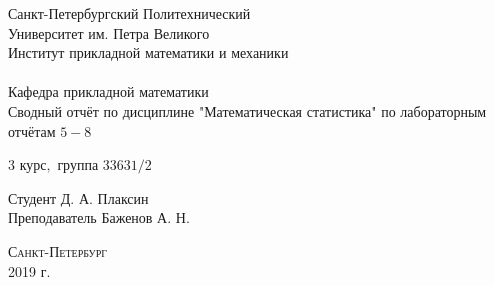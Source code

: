 \documentclass[a4]{article}
\begin{document}



\def\contentsname{\LARGE{Содержание}}
\thispagestyle{empty}
\begin{center} 
\vspace{2cm} 
{\Large \sc Санкт-Петербургский Политехнический}\\
\vspace{2mm}
{\Large \sc Университет} им. {\Large\sc Петра Великого}\\
\vspace{1cm}
{\large \sc Институт прикладной математики и механики\\ 
\vspace{0.5mm}
\textsc{}}\\ 
\vspace{0.5mm}
{\large\sc Кафедра прикладной математики}\\
\vspace{15mm}
{\huge \sc Сводный отчёт по дисциплине "Математическая статистика" по лабораторным отчётам $5-8$\\
\vspace{6mm}
 }
\vspace*{2mm}
\vspace{1cm}

{\sc $3$ курс$,$ группа $33631/2$}

\vspace{2cm} 
Студент \hfill Д. А. Плаксин\\
\vspace{1cm}
Преподаватель \hfill Баженов А. Н.\\
\vspace{20mm} 

\end{center} 
\begin{center}
\vfill {\large\textsc{Санкт-Петербург}}\\ 
2019 г.
\end{center}

\end{document}
